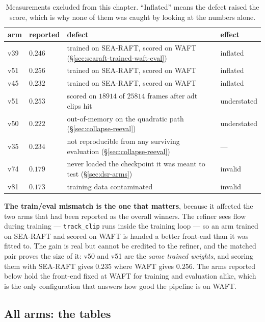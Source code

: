 \documentclass[11pt,a4paper]{article}
\begin{document}
\begin{table}[h]
\centering
\caption{Measurements excluded from this chapter. ``Inflated'' means the defect raised the score,
which is why none of them was caught by looking at the numbers alone.}
\label{tab:final-excluded}
\begin{tabular}{llll}
\toprule
arm & reported & defect & effect \\
\midrule
v39 & $0.246$ & trained on SEA-RAFT, scored on WAFT (\S\ref{sec:searaft-trained-waft-eval}) & inflated \\
v51 & $0.256$ & trained on SEA-RAFT, scored on WAFT & inflated \\
v45 & $0.232$ & trained on SEA-RAFT, scored on WAFT & inflated \\
\midrule
v51 & $0.253$ & scored on $18914$ of $25814$ frames after adt clips hit & understated \\
v50 & $0.222$ & out-of-memory on the quadratic path (\S\ref{sec:collapse-reeval}) & understated \\
\midrule
v35 & $0.234$ & not reproducible from any surviving evaluation (\S\ref{sec:collapse-reeval}) & --- \\
\midrule
v74 & $0.179$ & never loaded the checkpoint it was meant to test (\S\ref{sec:dsr-arms}) & invalid \\
v81 & $0.173$ & training data contaminated & invalid \\
\bottomrule
\end{tabular}
\end{table}

\textbf{The train/eval mismatch is the one that matters}, because it affected the two arms that
had been reported as the overall winners. The refiner sees flow during training ---
\texttt{track\_clip} runs inside the training loop --- so an arm trained on SEA-RAFT and scored
on WAFT is handed a better front-end than it was fitted to. The gain is real but cannot be
credited to the refiner, and the matched pair proves the size of it: v50 and v51 are the
\emph{same trained weights}, and scoring them with SEA-RAFT gives $0.235$ where WAFT gives
$0.256$. The arms reported below hold the front-end fixed at WAFT for training and evaluation
alike, which is the only configuration that answers how good the pipeline is on WAFT.

\subsection{All arms: the tables}
\label{sec:eval}
\end{document}
